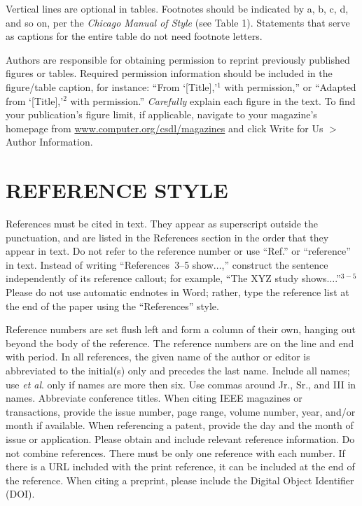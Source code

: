 \documentclass{IEEEcsmag}
\begin{document}
Vertical lines are optional in tables. Footnotes should be indicated by a, b, c, d, and so on, per the \emph{Chicago Manual of Style} (see Table 1). Statements that serve as captions for the entire table do not need footnote letters. 

Authors are responsible for obtaining permission to reprint previously published figures or tables. Required permission information should be included in the figure/table caption, for instance: ``From `[Title],'$^1$ with permission,'' or ``Adapted from `[Title],'$^2$ with permission.'' \emph{Carefully} explain each figure in the text. To find your publication's figure limit, if applicable, navigate to your magazine's homepage from \href{https://www.computer.org/csdl/magazines}{www.computer.org/csdl/magazines} and click Write for Us $>$ Author Information.




\section{REFERENCE STYLE}
References must be cited in text. They appear as superscript outside the punctuation, and are listed in the References section in the order that they appear in text. Do not refer to the reference number or use ``Ref.'' or ``reference'' in text. Instead of writing ``References~3--5 show$\ldots$,'' construct the sentence independently of its reference callout; for example, ``The XYZ study shows$\ldots$.''$^{3-5}$ Please do not use automatic endnotes in Word; rather, type the reference list at the end of the paper using the ``References'' style.

Reference numbers are set flush left and form a column of their own, hanging out beyond the body of the reference. The reference numbers are on the line and end with period. In all references, the given name of the author or editor is abbreviated to the initial(s) only and precedes the last name. Include all names; use \emph{et al}. only if names are more then six. Use commas around Jr., Sr., and III in names. Abbreviate conference titles. When citing IEEE magazines or transactions, provide the issue number, page range, volume number, year, and/or month if available. When referencing a patent, provide the day and the month of issue or application. Please obtain and include relevant reference information. Do not combine references. There must be only one reference with each number. If there is a URL included with the print reference, it can be included at the end of the reference. When citing a preprint, please include the Digital Object Identifier (DOI).
\end{document}
